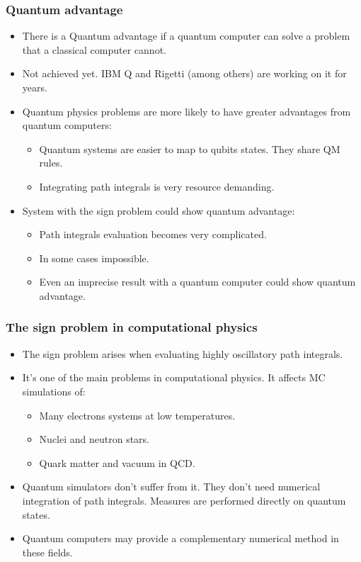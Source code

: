 \documentclass[10pt,t,xcolor=dvipsnames,aspectratio=169]{beamer}
\newlength\leftsidebar
\begin{document}
\begin{frame}
    \frametitle{Quantum advantage}
    \begin{itemize}
        \item
            There is a Quantum advantage if a quantum computer can solve a problem that a classical computer cannot.
        \item
            Not achieved yet. IBM Q and Rigetti (among others) are working on it for years.
        \item
            Quantum physics problems are more likely to have greater advantages from quantum computers:
            \begin{itemize}
                \item Quantum systems are easier to map to qubits states. They share QM rules.
                \item Integrating path integrals is very resource demanding.
            \end{itemize}
        \item
            System with the sign problem could show quantum advantage:
            \begin{itemize}
                \item Path integrals evaluation becomes very complicated.
                \item In some cases impossible.
                \item Even an imprecise result with a quantum computer could show quantum advantage.
            \end{itemize}
    \end{itemize}
\end{frame}

\leftsidebar
\begin{frame}[plain,t]
\titlepage
\end{frame}
\hoffset=0in %

\begin{frame}
    \frametitle{The sign problem in computational physics}
    \begin{itemize}
        \item
            The sign problem arises when evaluating highly oscillatory path integrals.
        \item
            It's one of the main problems in computational physics.
            It affects MC simulations of:
            \begin{itemize}
                \item Many electrons systems at low temperatures.
                \item Nuclei and neutron stars.
                \item Quark matter and vacuum in QCD.
            \end{itemize}
        \item
            Quantum simulators don't suffer from it.
            They don't need numerical integration of path integrals.
            Measures are performed directly on quantum states.
        \item
            Quantum computers may provide a complementary numerical method in these fields.
    \end{itemize}
\end{frame}
\end{document}
